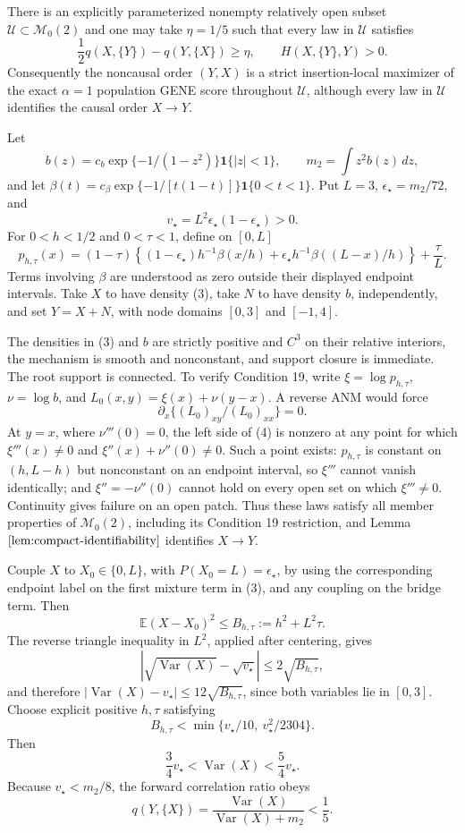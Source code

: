There is an explicitly parameterized nonempty relatively open subset \(\mathcal U\subset\mathcal M_0(2)\) and one may take \(\eta=1/5\) such that every law in \(\mathcal U\) satisfies
\[
 \frac12q(X,\{Y\})-q(Y,\{X\})\ge\eta,
 \qquad H(X,\{Y\},Y)>0.
\]
Consequently the noncausal order \((Y,X)\) is a strict insertion-local maximizer of the exact \(\alpha=1\) population GENE score throughout \(\mathcal U\), although every law in \(\mathcal U\) identifies the causal order \(X\to Y\).

Let
\[
 b(z)=c_b\exp\{-1/(1-z^2)\}\mathbf 1\{|z|<1\},
 \qquad m_2=\int z^2b(z)\,dz,
\]
and let \(\beta(t)=c_\beta\exp\{-1/[t(1-t)]\}\mathbf 1\{0<t<1\}\).  Put \(L=3\), \(\epsilon_\star=m_2/72\), and
\[
 v_\star=L^2\epsilon_\star(1-\epsilon_\star)>0.
\]
For \(0<h<1/2\) and \(0<\tau<1\), define on \([0,L]\)
\[
 p_{h,\tau}(x)
 =(1-\tau)\left\{(1-\epsilon_\star)h^{-1}\beta(x/h)
 +\epsilon_\star h^{-1}\beta((L-x)/h)\right\}+\frac{\tau}{L}. \tag{3}
\]
Terms involving \(\beta\) are understood as zero outside their displayed endpoint intervals.  Take \(X\) to have density (3), take \(N\) to have density \(b\), independently, and set \(Y=X+N\), with node domains \([0,3]\) and \([-1,4]\).

The densities in (3) and \(b\) are strictly positive and \(C^3\) on their relative interiors, the mechanism is smooth and nonconstant, and support closure is immediate.  The root support is connected.  To verify Condition 19, write \(\xi=\log p_{h,\tau}\), \(\nu=\log b\), and \(L_0(x,y)=\xi(x)+\nu(y-x)\).  A reverse ANM would force
\[
 \partial_x\{(L_0)_{xy}/(L_0)_{xx}\}=0. \tag{4}
\]
At \(y=x\), where \(\nu'''(0)=0\), the left side of (4) is nonzero at any point for which \(\xi'''(x)\ne0\) and \(\xi''(x)+\nu''(0)\ne0\).  Such a point exists: \(p_{h,\tau}\) is constant on \((h,L-h)\) but nonconstant on an endpoint interval, so \(\xi'''\) cannot vanish identically; and \(\xi''=-\nu''(0)\) cannot hold on every open set on which \(\xi'''\ne0\).  Continuity gives failure on an open patch.  Thus these laws satisfy all member properties of \(\mathcal M_0(2)\), including its Condition 19 restriction, and Lemma \(\ref{lem:compact-identifiability}\) identifies \(X\to Y\).

Couple \(X\) to \(X_0\in\{0,L\}\), with \(P(X_0=L)=\epsilon_\star\), by using the corresponding endpoint label on the first mixture term in (3), and any coupling on the bridge term.  Then
\[
 \mathbb E(X-X_0)^2\le B_{h,\tau}:=h^2+L^2\tau. \tag{5}
\]
The reverse triangle inequality in \(L^2\), applied after centering, gives
\[
 \left|\sqrt{\operatorname{Var}(X)}-\sqrt{v_\star}\right|
 \le2\sqrt{B_{h,\tau}},
\]
and therefore \(|\operatorname{Var}(X)-v_\star|\le12\sqrt{B_{h,\tau}}\), since both variables lie in \([0,3]\).  Choose explicit positive \(h,\tau\) satisfying
\[
 B_{h,\tau}<\min\{v_\star/10,\ v_\star^2/2304\}. \tag{6}
\]
Then
\[
 \frac34v_\star<\operatorname{Var}(X)<\frac54v_\star.
\]
Because \(v_\star<m_2/8\), the forward correlation ratio obeys
\[
 q(Y,\{X\})
 =\frac{\operatorname{Var}(X)}{\operatorname{Var}(X)+m_2}
 <\frac15. \tag{7}
\]

